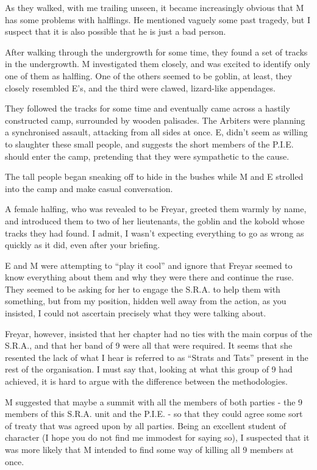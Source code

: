 As they walked, with me trailing unseen, it became increasingly obvious that M has some problems with halflings. He mentioned vaguely some past tragedy, but I suspect that it is also possible that he is just a bad person.\medskip

After walking through the undergrowth for some time, they found a set of tracks in the undergrowth. M investigated them closely, and was excited to identify only one of them as halfling. One of the others seemed to be goblin, at least, they closely resembled E’s, and the third were clawed, lizard-like appendages.\medskip

They followed the tracks for some time and eventually came across a hastily constructed camp, surrounded by wooden palisades. The Arbiters were planning a synchronised assault, attacking from all sides at once. E, didn’t seem as willing to slaughter these small people, and suggests the short members of the P.I.E. should enter the camp, pretending that they were sympathetic to the cause.\medskip

The tall people began sneaking off to hide in the bushes while M and E strolled into the camp and make casual conversation.\medskip

A female halfing, who was revealed to be Freyar, greeted them warmly by name, and introduced them to two of her lieutenants, the goblin and the kobold whose tracks they had found. I admit, I wasn’t expecting everything to go as wrong as quickly as it did, even after your briefing.\medskip

E and M were attempting to “play it cool” and ignore that Freyar seemed to know everything about them and why they were there and continue the ruse. They seemed to be asking for her to engage the S.R.A. to help them with something, but from my position, hidden well away from the action, as you insisted, I could not ascertain precisely what they were talking about.\medskip

Freyar, however, insisted that her chapter had no ties with the main corpus of the S.R.A., and that her band of 9 were all that were required. It seems that she resented the lack of what I hear is referred to as “Strats and Tats” present in the rest of the organisation. I must say that, looking at what this group of 9 had achieved, it is hard to argue with the difference between the methodologies.\medskip

M suggested that maybe a summit with all the members of both parties - the 9 members of this S.R.A. unit and the P.I.E. - so that they could agree some sort of treaty that was agreed upon by all parties. Being an excellent student of character (I hope you do not find me immodest for saying so), I suspected that it was more likely that M intended to find some way of killing all 9 members at once.\medskip


